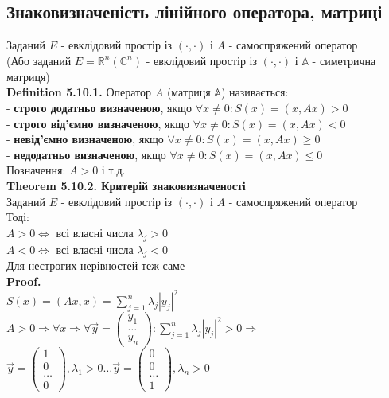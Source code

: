 \documentclass[a4paper, 10pt]{article}
\def\huge{\displaystyle}
\def\defin#1{\textbf{Definition {#1}}}
\def\th#1{\textbf{Theorem {#1}}}
\def\proof{\textbf{Proof.}\\}
\theoremstyle{theoremdd}
\theoremstyle{theoremdd}
\theoremstyle{theoremdd}
\theoremstyle{theoremdd}
\theoremstyle{theoremdd}
\theoremstyle{theoremdd}
\theoremstyle{theoremdd}
\theoremstyle{theoremdd}
\begin{document}
\subsection{Знаковизначеність лінійного оператора, матриці}
Заданий $E$ - евклідовий простір із $(\cdot,\cdot)$ і $A$ - самоспряжений оператор\\
(Або заданий $E = \mathbb{R}^n (\mathbb{C}^n)$ - евклідовий простір із $(\cdot,\cdot)$ і $\mathbb{A}$ - симетрична матриця)\\
\defin{5.10.1.} Оператор $A$ (матриця $\mathbb{A}$) називається:\\
- \textbf{строго додатньо визначеною}, якщо $\forall x \neq 0: S(x) = (x,Ax) > 0$\\
- \textbf{строго від'ємно визначеною}, якщо $\forall x \neq 0: S(x) = (x,Ax) < 0$\\
- \textbf{невід'ємно визначеною}, якщо $\forall x \neq 0: S(x) = (x,Ax) \geq 0$\\
- \textbf{недодатньо визначеною}, якщо $\forall x \neq 0: S(x) = (x,Ax) \leq 0$\\
Позначення: $A > 0$ і т.д.
\bigskip \\
\th{5.10.2. Критерій знаковизначеності}\\
Заданий $E$ - евклідовий простір із $(\cdot,\cdot)$ і $A$ - самоспряжений оператор\\
Тоді:\\
$A > 0 \iff$ всі власні числа $\lambda_j > 0$\\
$A < 0 \iff$ всі власні числа $\lambda_j < 0$\\
Для нестрогих нерівностей теж саме\\
\proof
$S(x) = (Ax,x) = \huge \sum_{j=1}^n \lambda_j |y_j|^2$\\
$A > 0 \Rightarrow \forall x \Rightarrow \forall \vec{y} = \begin{pmatrix}
y_1 \\ \dots \\ y_n
\end{pmatrix}: \huge \sum_{j=1}^n \lambda_j |y_j|^2 > 0 \Rightarrow$\\
$\vec{y} = \begin{pmatrix}
1 \\ 0 \\ \dots \\ 0
\end{pmatrix}, \lambda_1 > 0 \dots \vec{y} = \begin{pmatrix}
0 \\ 0 \\ \dots \\ 1
\end{pmatrix}, \lambda_n > 0$\\
\end{document}
